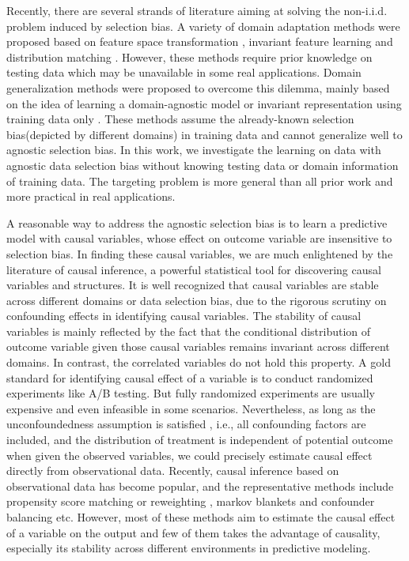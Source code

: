 \documentclass[sigconf]{acmart}
\begin{document}
Recently, there are several strands of literature aiming at solving the non-i.i.d. problem induced by selection bias. 
A variety of domain adaptation methods were proposed based on feature space transformation \cite{long2015learning,fernando2013unsupervised,DBLP:conf/mm/SanginetoZRS14,DBLP:journals/pami/MaYSH14}, invariant feature learning \cite{tzeng2015simultaneous,ganin2015unsupervised} and distribution matching \cite{zadrozny2004learning,long2016deep}.
However, these methods require prior knowledge on testing data which may be unavailable in some real applications.
Domain generalization methods were proposed to overcome this dilemma, mainly based on the idea of learning a domain-agnostic model or invariant representation using training data only \cite{Li2017Deeper,Muandet2013Domain,Ghifary2015Domain}.
These methods assume the already-known selection bias(depicted by different domains) in training data and cannot generalize well to agnostic selection bias.
In this work, we investigate the learning on data with agnostic data selection bias without knowing testing data or domain information of training data. 
The targeting problem is more general than all prior work and more practical in real applications.

A reasonable way to address the agnostic selection bias is to learn a predictive model with causal variables, whose effect on outcome variable are insensitive to selection bias.
In finding these causal variables, we are much enlightened by the literature of causal inference, a powerful statistical tool for discovering causal variables and structures.
It is well recognized that causal variables are stable across different domains or data selection bias, due to the rigorous scrutiny on confounding effects \cite{rosenbaum1983central} in identifying causal variables.
The stability of causal variables is mainly reflected by the fact that the conditional distribution of outcome variable given those causal variables remains invariant across different domains.
In contrast, the correlated variables do not hold this property.
A gold standard for identifying causal effect of a variable is to conduct randomized experiments like A/B testing.
But fully randomized experiments are usually expensive and even infeasible in some scenarios.
Nevertheless, as long as the unconfoundedness assumption is satisfied \cite{rosenbaum1983central}, i.e., all confounding factors are included, and the distribution of treatment is independent of potential outcome when given the observed variables, we could precisely estimate causal effect directly from observational data.
Recently, causal inference based on observational data has become popular, and the representative methods include propensity score matching or reweighting \cite{austin2011introduction,bang2005doubly,kuang2017treatment}, markov blankets \cite{pellet2008using,koller1996toward} and confounder balancing \cite{Kuang2017Estimating,athey2016approximate,hainmueller2011entropy} etc.
However, most of these methods aim to estimate the causal effect of a variable on the output and few of them takes the advantage of causality, especially its stability across different environments in predictive modeling.
\end{document}

